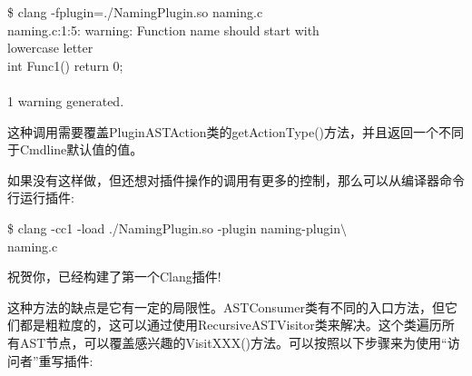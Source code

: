 \begin{tcolorbox}[colback=white,colframe=black]
\$ clang -fplugin=./NamingPlugin.so naming.c \\
naming.c:1:5: warning: Function name should start with \\
lowercase letter \\
int Func1() { return 0; } \\
\hspace*{0.7cm}\^ \\
1 warning generated.
\end{tcolorbox}

这种调用需要覆盖PluginASTAction类的getActionType()方法，并且返回一个不同于Cmdline默认值的值。\par

如果没有这样做，但还想对插件操作的调用有更多的控制，那么可以从编译器命令行运行插件:\par

\begin{tcolorbox}[colback=white,colframe=black]
\$ clang -cc1 -load ./NamingPlugin.so -plugin naming-plugin$\setminus$ \\
\hspace*{0.5cm}naming.c
\end{tcolorbox}

祝贺你，已经构建了第一个Clang插件!\par

这种方法的缺点是它有一定的局限性。ASTConsumer类有不同的入口方法，但它们都是粗粒度的，这可以通过使用RecursiveASTVisitor类来解决。这个类遍历所有AST节点，可以覆盖感兴趣的VisitXXX()方法。可以按照以下步骤来为使用“访问者”重写插件:\par

